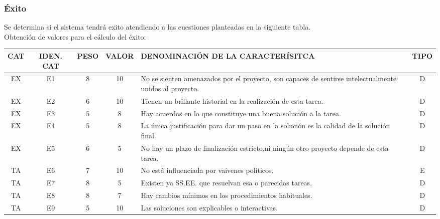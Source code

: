 \documentclass[letterpaper,12pt]{article}
\begin{document}
\subsubsection{Éxito}
Se determina si el sistema tendrá exito atendiendo a las cuestiones planteadas en la siguiente tabla.\\

Obtención de valores para el cálculo del éxito:

\begin{tabular}{|c|c|c|c|p{7.3 cm}|c|}
\hline 
CAT & IDEN. CAT & PESO & VALOR & DENOMINACIÓN DE LA CARACTERÍSITCA & TIPO \\ 
\hline 
EX & E1 & 8 & 10 & No se sienten amenazados por el proyecto, son capaces de sentirse intelectualmente unidos al proyecto. & D \\ 
\hline 
EX & E2 & 6 & 10 & Tienen un brillante historial en la realización de esta tarea. & D \\ 
\hline 
EX & E3 & 5 & 8 & Hay acuerdos en lo que constituye una buena solución a la tarea. & D \\ 
\hline 
EX & E4 & 5 & 8 & La única justificación para dar un paso en la solución es la calidad de la solución final. & D \\ 
\hline 
EX & E5 & 6 & 5 & No hay un plazo de finalización estricto,ni ningún otro proyecto depende de esta tarea. & D \\ 
\hline 
TA & E6 & 7 & 10 & No está influenciada por vaivenes políticos. & E \\ 
\hline 
TA & E7 & 8 & 5 & Existen ya SS.EE. que resuelvan esa o parecidas tareas. & D \\ 
\hline 
TA & E8 & 8 & 7 & Hay cambios mínimos en los procedimientos habituales. & D \\ 
\hline 
TA & E9 & 5 & 10 & Las soluciones son explicables o interactivas. & D \\ 
\hline 
\end{tabular} \\
\end{document}

